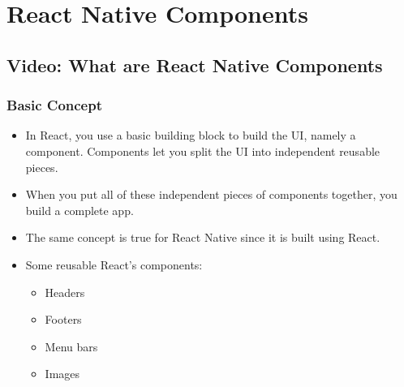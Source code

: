 \chapter{React Native Components}

\section{Video: What are React Native Components}
\subsection{Basic Concept}
\begin{itemize}
    \item In React, you use a basic building block to build the UI, namely a component. Components let you split the UI into independent reusable pieces. 
    \item When you put all of these independent pieces of components together, you build a complete app. 
    \item The same concept is true for React Native since it is built using React.
    \item Some reusable React's components:
    \begin{itemize}[label=$\circ$]
        \item Headers
        \item Footers
        \item Menu bars
        \item Images
    \end{itemize}
\end{itemize}

